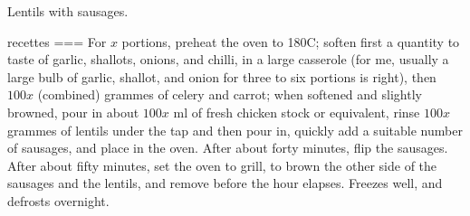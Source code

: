 Lentils with sausages.

recettes
===
For \(x\) portions, preheat the oven to 180C; soften first a quantity to taste of garlic, shallots, onions, and chilli, in a large casserole (for me, usually a large bulb of garlic, shallot, and onion for three to six portions is right), then \(100x\) (combined) grammes of celery and carrot; when softened and slightly browned, pour in about \(100x\) ml of fresh chicken stock or equivalent, rinse \(100x\) grammes of lentils under the tap and then pour in, quickly add a suitable number of sausages, and place in the oven. After about forty minutes, flip the sausages. After about fifty minutes, set the oven to grill, to brown the other side of the sausages and the lentils, and remove before the hour elapses. Freezes well, and defrosts overnight.